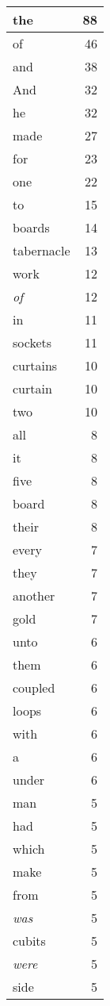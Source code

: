 \begin{center}
\begin{longtable}{l|r}
\hline \hline
\endlastfoot
the & 88 \\ \hline
of & 46 \\ \hline
and & 38 \\ \hline
And & 32 \\ \hline
he & 32 \\ \hline
made & 27 \\ \hline
for & 23 \\ \hline
one & 22 \\ \hline
to & 15 \\ \hline
boards & 14 \\ \hline
tabernacle & 13 \\ \hline
work & 12 \\ \hline
\emph{of} & 12 \\ \hline
in & 11 \\ \hline
sockets & 11 \\ \hline
curtains & 10 \\ \hline
curtain & 10 \\ \hline
two & 10 \\ \hline
all & 8 \\ \hline
it & 8 \\ \hline
five & 8 \\ \hline
board & 8 \\ \hline
their & 8 \\ \hline
every & 7 \\ \hline
they & 7 \\ \hline
another & 7 \\ \hline
gold & 7 \\ \hline
unto & 6 \\ \hline
them & 6 \\ \hline
coupled & 6 \\ \hline
loops & 6 \\ \hline
with & 6 \\ \hline
a & 6 \\ \hline
under & 6 \\ \hline
man & 5 \\ \hline
had & 5 \\ \hline
which & 5 \\ \hline
make & 5 \\ \hline
from & 5 \\ \hline
\emph{was} & 5 \\ \hline
cubits & 5 \\ \hline
\emph{were} & 5 \\ \hline
side & 5 \\ \hline

\end{longtable}
\end{center}
